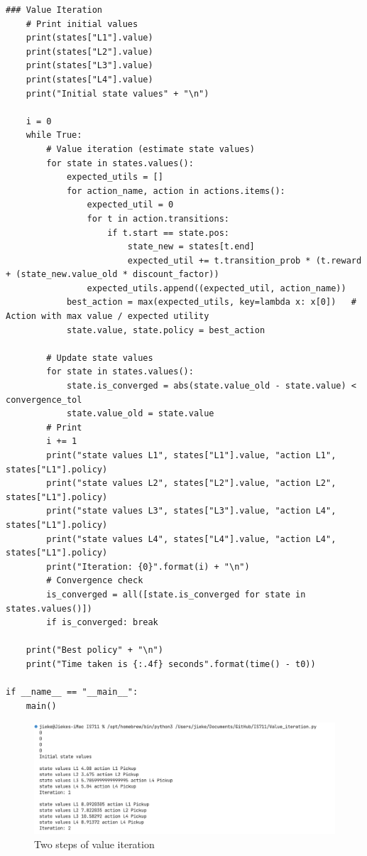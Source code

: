 \documentclass[conference]{styles/acmsiggraph}
\begin{document}
\begin{lstlisting}[caption={Core Code of Value Iteration}, label={lst:q6}]
	### Value Iteration
	# Print initial values
	print(states["L1"].value)
	print(states["L2"].value)
	print(states["L3"].value)
	print(states["L4"].value)
	print("Initial state values" + "\n")

	i = 0
	while True:
		# Value iteration (estimate state values)
		for state in states.values():
			expected_utils = []
			for action_name, action in actions.items():
				expected_util = 0
				for t in action.transitions:
					if t.start == state.pos:
						state_new = states[t.end]
						expected_util += t.transition_prob * (t.reward + (state_new.value_old * discount_factor))
				expected_utils.append((expected_util, action_name))
			best_action = max(expected_utils, key=lambda x: x[0])   # Action with max value / expected utility
			state.value, state.policy = best_action

		# Update state values
		for state in states.values():
			state.is_converged = abs(state.value_old - state.value) < convergence_tol
			state.value_old = state.value
		# Print
		i += 1
		print("state values L1", states["L1"].value, "action L1", states["L1"].policy)
		print("state values L2", states["L2"].value, "action L2", states["L1"].policy)
		print("state values L3", states["L3"].value, "action L4", states["L1"].policy)
		print("state values L4", states["L4"].value, "action L4", states["L1"].policy)
		print("Iteration: {0}".format(i) + "\n")
		# Convergence check
		is_converged = all([state.is_converged for state in states.values()])
		if is_converged: break

	print("Best policy" + "\n")
	print("Time taken is {:.4f} seconds".format(time() - t0))

if __name__ == "__main__":
	main()	
\end{lstlisting}

\begin{figure}[!h]
	\centering
	\includegraphics[width=\textwidth]{figures/q6.png}
	\caption{Two steps of value iteration}
	\label{fig:q6}
\end{figure}
\end{document}
